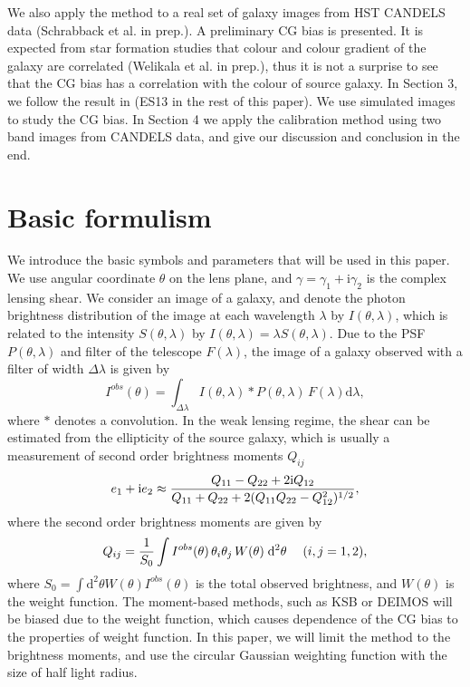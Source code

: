 \documentclass[useAMS,usenatbib]{mn2e}
\renewcommand{\d}{\mathrm{d}}
\newcommand{\ii}{\mathrm{i}}
\newcommand{\be}{\begin{equation}}
\newcommand{\ee}{\end{equation}}
\def\elabel#1{\label{eq:#1}}
\begin{document}
We also apply the method to a real set of galaxy images from HST
CANDELS data (Schrabback et al. in prep.). A preliminary CG bias is
presented. It is expected from star formation studies that colour and
colour gradient of the galaxy are correlated (Welikala et al. in prep.), thus it
is not a surprise to see that the CG bias has a correlation with the
colour of source galaxy. In Section 3, we follow the result in
\citet{2013MNRAS.432.2385S}(ES13 in the rest of this paper). We use
simulated images to study the CG bias. In Section 4 we apply the
calibration method using two band images from CANDELS data, and give
our discussion and conclusion in the end.


\section{Basic formulism}
We introduce the basic symbols and parameters that will be used in
this paper.  We use angular coordinate $\theta$ on the lens plane, and
$\gamma=\gamma_1 + \ii \gamma_2$ is the complex lensing shear. We
consider an image of a galaxy, and denote the photon brightness
distribution of the image at each wavelength $\lambda$ by
$I(\theta,\lambda)$, which is related to the intensity
$S(\theta,\lambda)$ by $I(\theta,\lambda)=\lambda S(\theta,\lambda)$.
Due to the PSF $P(\theta,\lambda)$ and filter of the telescope
$F(\lambda)$, the image of a galaxy observed with a filter of width
$\Delta \lambda$ is given by
%
\be
I^{obs}(\theta) = \int_{\Delta\lambda} I(\theta, \lambda) *  P(\theta,\lambda)
\, F(\lambda)\d \lambda,
\elabel{iobs}
\ee
%
where $*$ denotes a convolution. In the weak lensing regime, the
shear can be estimated from the ellipticity of the source galaxy,
which is usually a measurement of second order brightness moments
$Q_{ij}$ \citep{2001PhR...340..291B}
%
\be
e_1+\ii e_2 \approx
{Q_{11} - Q_{22} + 2 \ii Q_{12} \over Q_{11} + Q_{22} +2(Q_{11}Q_{22} - Q_{12}^2)^{1/2} },
\elabel{mshear}
\ee
%
where the second order brightness moments are given by
%
\be
Q_{ij} = {1 \over S_0} \int  I^{obs}(\theta)\, \theta_i \theta_j \, W(\theta)\; \d^2 \theta \quad\; (i,j=1,2),
\ee
%
where $S_0=\int \d^2\theta W(\theta) I^{obs}(\theta)$ is the total observed
brightness, and $W(\theta)$ is the weight function. The moment-based
methods, such as KSB \citep{1995ApJ...449..460K} or DEIMOS
\citep{2011MNRAS.412.1552M} will be biased due to the weight function,
which causes dependence of the CG bias to the properties of weight
function.  In this paper, we will limit the method to the brightness
moments, and use the circular Gaussian weighting function with the
size of half light radius.
\end{document}
